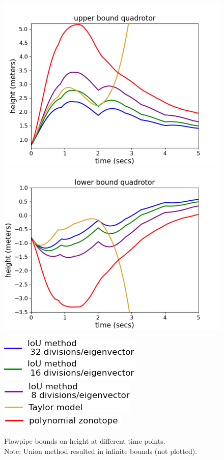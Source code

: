 \begin{figure}
\includegraphics[scale = 0.41]{quadrotorImages/ubToolHeight.png}\hspace{-2.2em}
\includegraphics[scale = 0.41]{quadrotorImages/lbToolHeight.png}

\includegraphics[scale = 0.41]{quadrotorImages/leg1.png}~
  \includegraphics[scale = 0.41]{quadrotorImages/leg2.png}~
  \includegraphics[scale = 0.41]{quadrotorImages/leg3.png}
\caption{Flowpipe bounds on height at different time points.\\
Note: Union method resulted in infinite bounds (not plotted).}\label{fig:flowquadrotor}
\end{figure}
% 
